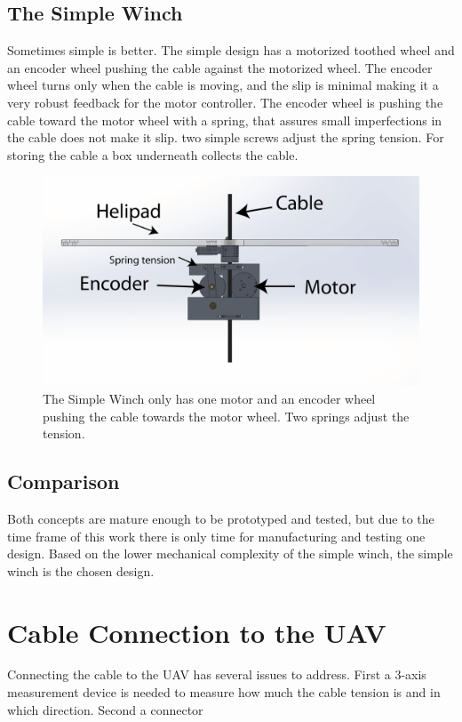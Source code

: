 
\subsection{The Simple Winch}
Sometimes simple is better. The simple design has a motorized toothed wheel and an encoder wheel pushing the cable against the motorized wheel. The encoder wheel turns only when the cable is moving, and the slip is minimal making it a very robust feedback for the motor controller. The encoder wheel is pushing the cable toward the motor wheel with a spring, that assures small imperfections in the cable does not make it slip. two simple screws adjust the spring tension. For storing the cable a box underneath collects the cable.

\begin{figure}[H]
\centering
\includegraphics[scale=0.75]{graphics/cad/winch.png}
\caption{The Simple Winch only has one motor and an encoder wheel pushing the cable towards the motor wheel. Two springs adjust the tension.}
\label{fig:winch}
\end{figure}

\subsection{Comparison}
Both concepts are mature enough to be prototyped and tested, but due to the time frame of this work there is only time for manufacturing and testing one design. Based on the lower mechanical complexity of the simple winch, the simple winch is the chosen design.    


\section{Cable Connection to the UAV}
Connecting the cable to the UAV has several issues to address. First a 3-axis measurement device is needed to measure how much the cable tension is and in which direction. Second a connector 





